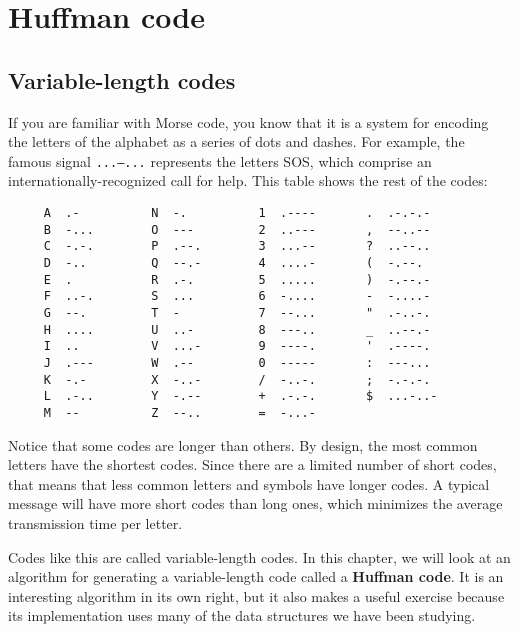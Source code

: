 \chapter{Huffman code}
\label{huffman}

\section{Variable-length codes}

If you are familiar with Morse code, you know that it is a system
for encoding the letters of the alphabet as a series of dots and
dashes.  For example, the famous signal {\tt ...---...} represents
the letters SOS, which comprise an internationally-recognized call
for help.  This table shows the rest of the codes:

\begin{verbatim}
     A  .-          N  -.          1  .----       .  .-.-.-
     B  -...        O  ---         2  ..---       ,  --..--
     C  -.-.        P  .--.        3  ...--       ?  ..--..
     D  -..         Q  --.-        4  ....-       (  -.--.
     E  .           R  .-.         5  .....       )  -.--.-
     F  ..-.        S  ...         6  -....       -  -....-
     G  --.         T  -           7  --...       "  .-..-.
     H  ....        U  ..-         8  ---..       _  ..--.-
     I  ..          V  ...-        9  ----.       '  .----.
     J  .---        W  .--         0  -----       :  ---...
     K  -.-         X  -..-        /  -..-.       ;  -.-.-.
     L  .-..        Y  -.--        +  .-.-.       $  ...-..-
     M  --          Z  --..        =  -...-
\end{verbatim}


Notice that some codes are longer than others.  By design, the
most common letters have the shortest codes.  Since there are a
limited number of short codes, that means that less common
letters and symbols have longer codes.  A typical message will
have more short codes than long ones, which minimizes the average
transmission time per letter.


Codes like this are called variable-length codes.  In this chapter,
we will look at an algorithm for generating a variable-length code
called a {\bf Huffman code}.  It is an interesting algorithm in
its own right, but it also makes a useful exercise because its
implementation uses many of the data structures we have been studying.


